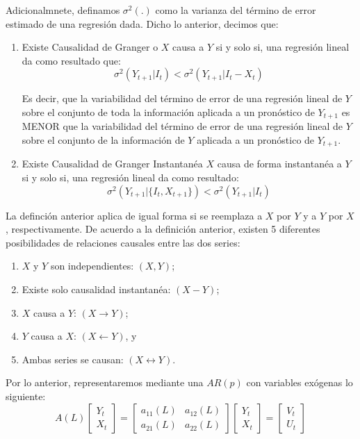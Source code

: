 \documentclass[
  a4paper,
]{article}
\begin{document}
Adicionalmnete, definamos \(\sigma^2(.)\) como la varianza del término
de error estimado de una regresión dada. Dicho lo anterior, decimos que:

\begin{enumerate}
    \item Existe Causalidad de Granger o $X$ causa a $Y$ si y solo si, una regresión lineal da como resultado que: 
    $$
        \sigma^2 (Y_{t+1} | I_t) < \sigma^2 (Y_{t+1} | I_t - X_t)    
    $$
    
    Es decir, que la variabilidad del término de error de una regresión lineal de $Y$ sobre el conjunto de toda la información aplicada a un pronóstico de $Y_{t+1}$ es MENOR que la variabilidad del término de error de una regresión lineal de $Y$ sobre el conjunto de la información de $Y$ aplicada a un pronóstico de $Y_{t+1}$.
    
    \item Existe Causalidad de Granger Instantanéa $X$ causa de forma instantanéa a $Y$ si y solo si, una regresión lineal da como resultado:
    $$
        \sigma^2 (Y_{t+1} | \{ I_t, X_{t+1} \}) < \sigma^2 (Y_{t+1} | I_t)
    $$
    
\end{enumerate}

La definción anterior aplica de igual forma si se reemplaza a \(X\) por
\(Y\) y a \(Y\) por \(X\), respectivamente. De acuerdo a la definición
anterior, existen 5 diferentes posibilidades de relaciones causales
entre las dos series:

\begin{enumerate}
\item $X$ y $Y$ son independientes: $(X, Y)$;

\item Existe solo causalidad instantanéa: $(X - Y)$;

\item $X$ causa a $Y$: $(X \longrightarrow Y)$;

\item $Y$ causa a $X$: $(X \longleftarrow Y)$, y

\item Ambas series se causan: $(X \longleftrightarrow Y)$.

\end{enumerate}

Por lo anterior, representaremos mediante una \(AR(p)\) con variables
exógenas lo siguiente: \[
    A(L) 
    \begin{bmatrix}
    Y_t \\ X_t
    \end{bmatrix}
    =
    \begin{bmatrix}
    a_{11}(L) & a_{12}(L) \\ a_{21}(L) & a_{22}(L)
    \end{bmatrix}
    \begin{bmatrix}
    Y_t \\ X_t
    \end{bmatrix}
    =
    \begin{bmatrix}
    V_t \\ U_t
    \end{bmatrix}
    \label{Granger_Eq}
\]
\end{document}
